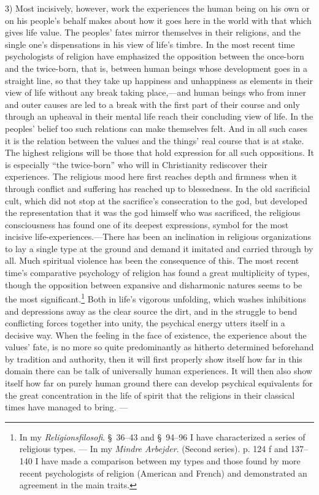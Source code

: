 \documentclass[12pt,a4paper]{book}
\newcommand{\opage}[1]{\marginnote{\footnotesize\textit{[#1]}}}
\begin{document}
3) Most incisively, however, work the experiences the human being on his own or on his people's behalf
makes about how it goes here in the world with that which gives life value. The peoples' fates mirror
themselves in their religions, and the single one's dispensations in his view of life's timbre. In the
most recent time psychologists of religion have emphasized the opposition between the once-born and the
twice-born, that is, \opage{388}between human beings whose development goes in a straight line, so that they take up
happiness and unhappiness as elements in their view of life without any break taking place,---and human
beings who from inner and outer causes are led to a break with the first part of their course and only
through an upheaval in their mental life reach their concluding view of life. In the peoples' belief too
such relations can make themselves felt. And in all such cases it is the relation between the values and
the things' real course that is at stake. The highest religions will be those that hold expression for
all such oppositions. It is especially ``the twice-born'' who will in Christianity rediscover their
experiences. The religious mood here first reaches depth and firmness when it through conflict and
suffering has reached up to blessedness. In the old sacrificial cult, which did not stop at the
sacrifice's consecration to the god, but developed the representation that it was the god himself who was
sacrificed, the religious consciousness has found one of its deepest expressions, symbol for the most
incisive life-experiences.---There has been an inclination in religious organizations to lay a single type
at the ground and demand it imitated and carried through by all. Much spiritual violence has been the
consequence of this. The most recent time's comparative psychology of religion has found a great
multiplicity of types, though the opposition between expansive and disharmonic natures seems to be the
most significant.\footnote{In my \emph{Religionsfilosofi}. \S\ 36--43 and \S\ 94--96 I have characterized
a series of religious types. --- In my \emph{Mindre Arbejder}. (Second series). p. 124 f and 137--140 I
have made a comparison between my types and those found by more recent psychologists of religion (American
and French) and demonstrated an agreement in the main traits.} Both in life's vigorous unfolding, which
washes inhibitions and depressions away as the clear source the dirt, and in the struggle to bend
conflicting forces together into unity, the psychical energy utters itself in a decisive way. When the
feeling in the face of existence, the experience about the values' fate, is no more so quite predominantly
as hitherto determined beforehand by tradition and authority, then it will first properly show itself how
far in this domain there can be talk of universally human experiences. It will then also show itself how
far \opage{389}on purely human ground there can develop psychical equivalents for the great concentration in the life
of spirit that the religions in their classical times have managed to bring. ---
\end{document}
